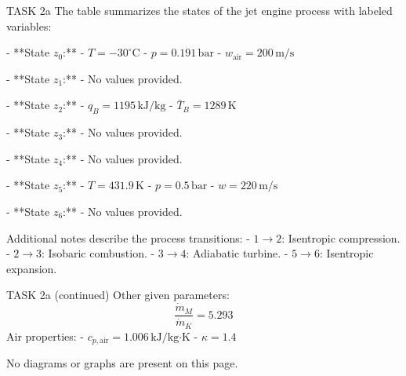 TASK 2a  
The table summarizes the states of the jet engine process with labeled variables:  

- **State \( z_0 \):**  
  - \( T = -30^\circ\text{C} \)  
  - \( p = 0.191 \, \text{bar} \)  
  - \( w_{\text{air}} = 200 \, \text{m/s} \)  

- **State \( z_1 \):**  
  - No values provided.  

- **State \( z_2 \):**  
  - \( q_B = 1195 \, \text{kJ/kg} \)  
  - \( \bar{T}_B = 1289 \, \text{K} \)  

- **State \( z_3 \):**  
  - No values provided.  

- **State \( z_4 \):**  
  - No values provided.  

- **State \( z_5 \):**  
  - \( T = 431.9 \, \text{K} \)  
  - \( p = 0.5 \, \text{bar} \)  
  - \( w = 220 \, \text{m/s} \)  

- **State \( z_6 \):**  
  - No values provided.  

Additional notes describe the process transitions:  
- \( 1 \to 2 \): Isentropic compression.  
- \( 2 \to 3 \): Isobaric combustion.  
- \( 3 \to 4 \): Adiabatic turbine.  
- \( 5 \to 6 \): Isentropic expansion.  

TASK 2a (continued)  
Other given parameters:  
\[
\frac{\dot{m}_M}{\dot{m}_K} = 5.293
\]  
Air properties:  
- \( c_{p,\text{air}} = 1.006 \, \text{kJ/kg·K} \)  
- \( \kappa = 1.4 \)  

No diagrams or graphs are present on this page.